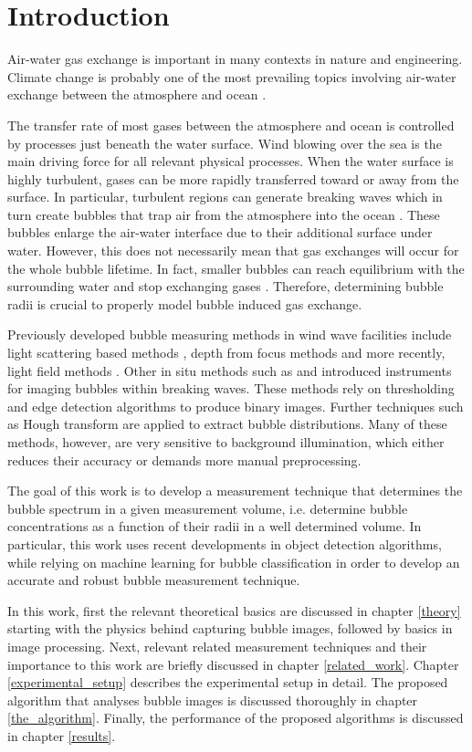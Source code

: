 \chapter{Introduction}
	Air-water gas exchange is important in many contexts in nature and engineering. Climate change is probably one of the most prevailing topics involving air-water exchange between the atmosphere and ocean \citep{NIWA}.
	
	The transfer rate of most gases between the atmosphere and ocean is controlled by processes just beneath the water surface. Wind blowing over the sea is the main driving force for all relevant physical processes. 
	When the water surface is highly turbulent, gases can be more rapidly transferred toward or away from the surface. In particular, turbulent regions can generate breaking waves which in turn create bubbles that trap air from the atmosphere into the ocean \citep{Terry}. These bubbles enlarge the air-water interface due to their additional surface under water. However, this does not necessarily mean that gas exchanges will occur for the whole bubble lifetime. In fact, smaller bubbles can reach equilibrium with the surrounding water and stop exchanging gases \citep{MischlerDiss}. Therefore, determining bubble radii is crucial to properly model bubble induced gas exchange.
	
	Previously developed bubble measuring methods in wind wave facilities include light scattering based methods \citep{jaehne1984}, depth from focus methods \citep{geissler_1995} and more recently, light field methods \citep{MischlerDiss}. Other in situ methods such as \citet{Al-Lashi2016} and \citet{Leifer2003} introduced instruments for imaging bubbles within breaking waves. These methods rely on thresholding and edge detection algorithms to produce binary images. Further techniques such as Hough transform \citep{Hough1972} are applied to extract bubble distributions. Many of these methods, however, are very sensitive to background illumination, which either reduces their accuracy \citep{Zhong2016} or demands more manual preprocessing.  
	
	The goal of this work is to develop a measurement technique that determines the bubble spectrum in a given measurement volume, i.e. determine bubble concentrations as a function of their radii in a well determined volume. In particular, this work uses recent developments in object detection algorithms, while relying on machine learning for bubble classification in order to develop an accurate and robust bubble measurement technique. 
	
	In this work, first the relevant theoretical basics are discussed in chapter \ref{theory} starting with the physics behind capturing bubble images, followed by basics in image processing. Next, relevant related measurement techniques and their importance to this work are briefly discussed in chapter \ref{related_work}. Chapter \ref{experimental_setup} describes the experimental setup in detail. The proposed algorithm that analyses bubble images is discussed thoroughly in chapter \ref{the_algorithm}. Finally, the performance of the proposed algorithms is discussed in chapter \ref{results}.